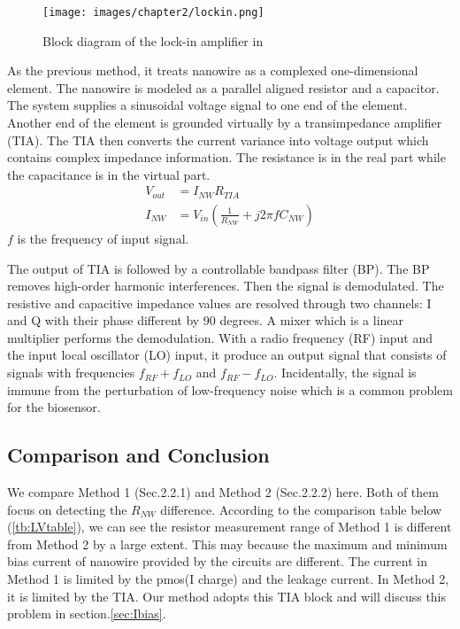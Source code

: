 \begin{figure}[!htbp]
        \centering
        \texttt{[image: images/chapter2/lockin.png]}
        \caption{Block diagram of the lock-in amplifier in \cite{Jlockin}}
        \label{fig:lockin}
\end{figure}

As the previous method, it treats nanowire as a complexed one-dimensional element. The nanowire is modeled as a parallel aligned resistor and a capacitor.
The system supplies a sinusoidal voltage signal to one end of the element.
Another end of the element is grounded virtually by a transimpedance amplifier (TIA).
The TIA then converts the current variance into voltage output which contains complex impedance information.
The resistance is in the real part while the capacitance is in the virtual part.
\setlength{\mathindent}{5.5cm}
\begin{align}
    V_{out} &= I_{NW}R_{TIA} \\
    I_{NW} &= V_{in}(\frac{1}{R_{NW}} + j 2\pi fC_{NW})
\end{align}
$f$ is the frequency of input signal.

The output of TIA is followed by a controllable bandpass filter (BP).
The BP removes high-order harmonic interferences.
Then the signal is demodulated.
The resistive and capacitive impedance values are resolved through two channels: I and Q with their phase different by 90 degrees.
A mixer which is a linear multiplier performs the demodulation.
With a radio frequency (RF) input and the input local oscillator (LO) input, it produce an output signal that consists of signals with frequencies $f_{RF} + f_{LO}$ and $f_{RF} - f_{LO}$.
Incidentally, the signal is immune from the perturbation of low-frequency noise which is a common problem for the biosensor.

\subsection{Comparison and Conclusion} \label{sec:ch2CC}
We compare Method 1 (Sec.2.2.1) and Method 2 (Sec.2.2.2) here.
Both of them focus on detecting the $R_{NW}$ difference.
According to the comparison table below (\ref{tb:LVtable}), we can see the resistor measurement range of Method 1 is different from Method 2 by a large extent.
This may because the maximum and minimum bias current of nanowire provided by the circuits are different.
The current in Method 1 is limited by the pmos(I charge) and the leakage current.
In Method 2, it is limited by the TIA.
Our method adopts this TIA block and will discuss this problem in section.\ref{sec:Ibias}.

